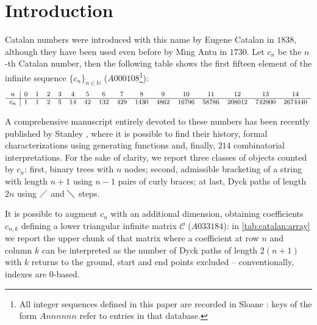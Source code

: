 
\section{Introduction}

\noindent Catalan numbers were introduced with this name by
Eugene Catalan in $1838$, although they have been used even before by Ming Antu
in $1730$. Let $c_{n}$ be the $n$-th Catalan number, then the following
table shows the first fifteen element of the infinite sequence 
$\lbrace c_{n}\rbrace_{n\in\mathbb{N}}$ ($A000108$\footnote{All integer sequences
defined in this paper are recorded in Sloane \cite{sloane:oeis}: keys of
the form $Annnnnn$ refer to entries in that database.}):
\begin{displaymath}
    \footnotesize
    \begin{array}{c|ccccccccccccccc}
        n & 0 & 1 & 2 & 3 & 4 & 5 & 6 & 7 & 8 & 9 & 10 & 11 & 12 & 13 & 14 \\
        \hline
        c_{n} & 1 & 1 & 2 & 5 & 14 & 42 & 132 & 429 & 1430 & 4862 & 16796 & 58786 & 208012 & 742900 & 2674440
    \end{array}
\end{displaymath}

A comprehensive manuscript entirely devoted to these numbers has been recently
published by Stanley \cite{stanley:2015}, where it is possible to find their history,
formal characterizations using generating functions and, finally, $214$ combinatorial 
interpretations.  For the sake of clarity, we report three classes of objects counted by 
$c_{n}$: first, binary trees with $n$ nodes; 
second, admissible bracketing of a string with length $n+1$ using $n-1$ pairs
of curly braces; at last, Dyck paths of length $2n$ using $\diagup$ and $\diagdown$ steps.

It is possible to augment $c_{n}$ with an additional dimension,
obtaining coefficients $c_{n,k}$ defining a lower triangular infinite 
matrix $\mathcal{C}$ ($A033184$): in \autoref{tab:catalan:array} 
we report the upper chunk of that matrix where a coefficient at row $n$ 
and column $k$ can be interpreted as the number
of Dyck paths of length $2(n+1)$ with $k$ returns to the ground, start
and end points excluded -- conventionally, indexes are $0$-based.



